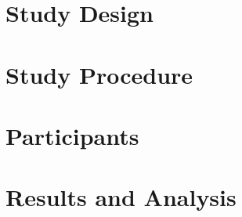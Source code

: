 \section{Study Design}

\section{Study Procedure}

\section{Participants}

\section{Results and Analysis}

